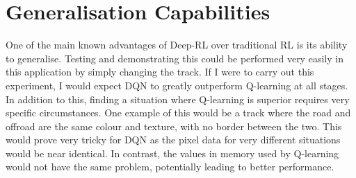 \section{Generalisation Capabilities}
One of the main known advantages of Deep-RL over traditional RL is its ability to generalise. Testing and demonstrating this could be performed very easily in this application by simply changing the track. If I were to carry out this experiment, I would expect DQN to greatly outperform Q-learning at all stages. In addition to this, finding a situation where Q-learning is superior requires very specific circumstances. One example of this would be a track where the road and offroad are the same colour and texture, with no border between the two. This would prove very tricky for DQN as the pixel data for very different situations would be near identical. In contrast, the values in memory used by Q-learning would not have the same problem, potentially leading to better performance.
